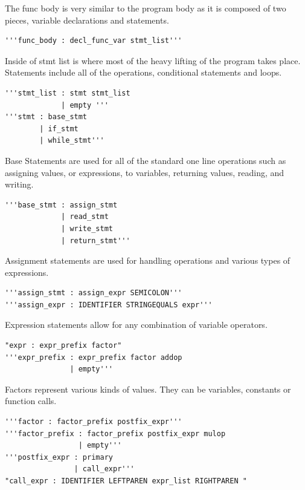 \documentclass[12pt]{article}
\begin{document}
           The func body is very similar to the program body as it is composed of two pieces, variable declarations and statements.
           
           \begin{verbatim}
'''func_body : decl_func_var stmt_list'''
           \end{verbatim}
           
           Inside of stmt list is where most of the heavy lifting of the program takes place.  Statements include all of the operations, conditional statements and loops.
           
            \begin{verbatim}
'''stmt_list : stmt stmt_list
             | empty '''
'''stmt : base_stmt
        | if_stmt
        | while_stmt'''
           \end{verbatim}
           
           Base Statements are used for all of the standard one line operations such as assigning values, or expressions, to variables, returning values, reading, and writing.
           \begin{verbatim}
'''base_stmt : assign_stmt
             | read_stmt
             | write_stmt
             | return_stmt'''
           \end{verbatim}
           
           Assignment statements are used for handling operations and various types of expressions.
           
           \begin{verbatim}
'''assign_stmt : assign_expr SEMICOLON'''
'''assign_expr : IDENTIFIER STRINGEQUALS expr'''
            \end{verbatim}      
           
            Expression statements allow for any combination of variable operators.  
            
            \begin{verbatim}
"expr : expr_prefix factor"      
'''expr_prefix : expr_prefix factor addop
               | empty'''
            \end{verbatim}     
            
            Factors represent various kinds of values.  They can be variables, constants or function calls.
            
            \begin{verbatim}
'''factor : factor_prefix postfix_expr'''
'''factor_prefix : factor_prefix postfix_expr mulop
                 | empty'''
'''postfix_expr : primary
                | call_expr'''  
"call_expr : IDENTIFIER LEFTPAREN expr_list RIGHTPAREN "                                          
            \end{verbatim}  
            
\end{document}
